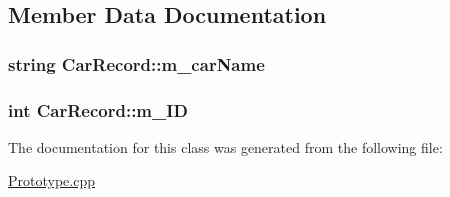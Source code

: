 \subsection{Member Data Documentation}
\subsubsection[{\texorpdfstring{m\+\_\+car\+Name}{m_carName}}]{\setlength{\rightskip}{0pt plus 5cm}string Car\+Record\+::m\+\_\+car\+Name\hspace{0.3cm}{\ttfamily [private]}}\hypertarget{classCarRecord_a11d736579cd5caeb73076ec2b5ca59ba}{}\label{classCarRecord_a11d736579cd5caeb73076ec2b5ca59ba}
\subsubsection[{\texorpdfstring{m\+\_\+\+ID}{m_ID}}]{\setlength{\rightskip}{0pt plus 5cm}int Car\+Record\+::m\+\_\+\+ID\hspace{0.3cm}{\ttfamily [private]}}\hypertarget{classCarRecord_a2ec8ef22ca91cb79481b189cfa9dce7c}{}\label{classCarRecord_a2ec8ef22ca91cb79481b189cfa9dce7c}


The documentation for this class was generated from the following file\+:\begin{DoxyCompactItemize}
\item 
\hyperlink{Prototype_8cpp}{Prototype.\+cpp}\end{DoxyCompactItemize}
